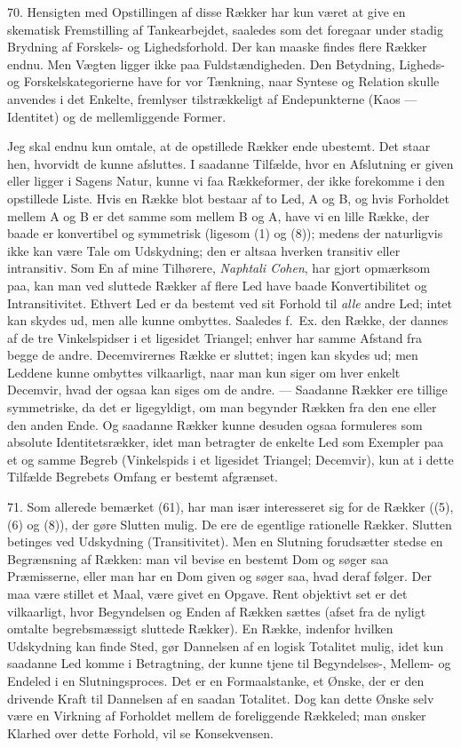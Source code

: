 \documentclass[12pt,a4paper]{book}
\newcommand{\apage}[1]{\marginnote{\footnotesize\textit{[#1]}}}
\begin{document}
70. Hensigten med Opstillingen af disse Rækker har kun været at give en
skematisk Fremstilling af Tankearbejdet, saaledes som det foregaar
under stadig Brydning af Forskels- og Lighedsforhold. Der kan maaske
findes flere Rækker endnu. Men Vægten ligger ikke paa Fuldstændigheden.
Den Betydning, Ligheds- og Forskelskategorierne have for vor Tænkning,
naar Syntese og Relation skulle anvendes i det Enkelte, fremlyser
tilstrækkeligt af Endepunkterne (Kaos --- Identitet) og de
mellemliggende Former.

Jeg skal endnu kun omtale, at de opstillede Rækker ende ubestemt. Det
staar hen, hvorvidt de kunne afsluttes. I saadanne Tilfælde, hvor en
Afslutning er given eller ligger i Sagens Natur, kunne vi faa
Rækkeformer, der ikke forekomme i den opstillede Liste. Hvis en Række
blot bestaar af to Led, A og B, og hvis Forholdet mellem A og B er det
samme som mellem B og A, have vi en lille Række, der baade er
konvertibel og symmetrisk (ligesom (1) og (8)); medens der naturligvis
ikke kan være Tale om Udskydning; den er altsaa hverken transitiv eller
intransitiv. Som En af mine Tilhørere, \emph{Naphtali Cohen}, har gjort
opmærksom paa, kan man ved sluttede Rækker af flere Led have baade
Konvertibilitet og Intransitivitet. Ethvert Led er da bestemt ved sit
Forhold til \emph{alle} andre Led; intet kan skydes ud, men alle kunne
ombyttes. Saaledes f.\ Ex. den Række, der \apage{173} dannes af de tre
Vinkelspidser i et ligesidet Triangel; enhver har samme Afstand fra
begge de andre. Decemvirernes Række er sluttet; ingen kan skydes ud;
men Leddene kunne ombyttes vilkaarligt, naar man kun siger om hver
enkelt Decemvir, hvad der ogsaa kan siges om de andre. --- Saadanne
Rækker ere tillige symmetriske, da det er ligegyldigt, om man begynder
Rækken fra den ene eller den anden Ende. Og saadanne Rækker kunne
desuden ogsaa formuleres som absolute Identitetsrækker, idet man
betragter de enkelte Led som Exempler paa et og samme Begreb
(Vinkelspids i et ligesidet Triangel; Decemvir), kun at i dette
Tilfælde Begrebets Omfang er bestemt afgrænset.

71. Som allerede bemærket (61), har man især interesseret sig for de
Rækker ((5), (6) og (8)), der gøre Slutten mulig. De ere de egentlige rationelle Rækker. Slutten betinges ved Udskydning (Transitivitet). Men
en Slutning forudsætter stedse en Begrænsning af Rækken: man vil bevise
en bestemt Dom og søger saa Præmisserne, eller man har en Dom given og
søger saa, hvad deraf følger. Der maa være stillet et Maal, være givet
en Opgave. Rent objektivt set er det vilkaarligt, hvor Begyndelsen og
Enden af Rækken sættes (afset fra de nyligt omtalte begrebsmæssigt
sluttede Rækker). En Række, indenfor hvilken Udskydning kan finde Sted,
gør Dannelsen af en logisk Totalitet mulig, idet kun saadanne Led komme i Betragtning, der kunne tjene til Begyndelses-,
Mellem- og Endeled i en Slutningsproces. Det er en Formaalstanke, et
Ønske, der er den drivende Kraft til Dannelsen af en saadan Totalitet.
Dog kan dette Ønske selv være en Virkning af Forholdet mellem de
foreliggende Rækkeled; man ønsker Klarhed over dette Forhold, vil se
Konsekvensen.
\end{document}

